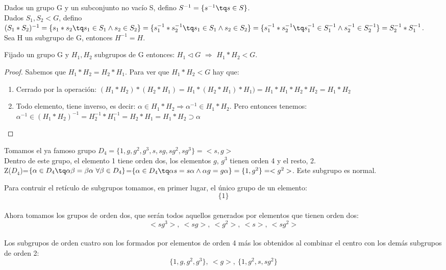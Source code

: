 \documentclass[a4paper,10pt]{apuntes}
\begin{document}
 Dados un grupo G y un subconjunto no vacío S, defino $S^{-1}=\{s^{-1}\tq s\in S\}$.\\
 Dados $S_{1},S_{2}<G$, defino $(S_{1}*S_{2})^{-1}=\{s_{1}*s_{2}\tq s_{1}\in S_{1} \wedge s_{2}\in S_{2}\}=\{s_{1}^{-1}*s_{2}^{-1}\tq s_{1}\in S_{1} \wedge s_{2}\in S_{2}\}=
 \{s_{1}^{-1}*s_{2}^{-1}\tq s_{1}^{-1}\in S_{1}^{-1} \wedge s_{2}^{-1}\in S_{2}^{-1}\}=S_{2}^{-1}*S_{1}^{-1}$.\\
 Sea H un subgrupo de G, entonces $H^{-1}=H$.
 
 \begin{theorem}
  Fijado un grupo G y $H_{1}, H_{2}$  subgrupos de G entonces: $H_{1} \vartriangleleft G$ $\Rightarrow$ $H_{1}*H_{2}<G$. 
 \end{theorem}
 \begin{proof}
  Sabemos que $H_{1}*H_{2}=H_{2}*H_{1}$. Para ver que $H_{1}*H_{2}<G$  hay que:
  \begin{enumerate}
   \item Cerrado por la operación: $(H_{1}*H_{2})*(H_{2}*H_{1})=H_{1}*(H_{2}*H_{1})*H_{1})=H_{1}*H_{1}*H_{2}*H_{2}=H_{1}*H_{2}$
   \item Todo elemento, tiene inverso, es decir: $\alpha\in H_{1}*H_{2}\Rightarrow \alpha^{-1}\in H_{1}*H_{2}$. Pero entonces tenemos:
   $\alpha^{-1}\in (H_{1}*H_{2})^{-1} = H_{2}^{-1}*H_{1}^{-1}=H_{2}*H_{1}=H_{1}*H_{2}\supset\alpha$
  \end{enumerate}

 \end{proof}

 \begin{example}
  Tomamos el ya famoso grupo $D_{4}=\{1,g,g^{2},g^{3}, s, sg, sg^{2}, sg^{3}\}=<s,g>$\\
  Dentro de este grupo, el elemento 1 tiene orden dos, los elementos $g$, $g^{3}$  tienen orden 4 y el resto, 2.\\
  Z($D_{4}$)=$\{\alpha\in D_{4} \tq \alpha\beta=\beta\alpha \ \forall \beta \in D_{4}\}$=$\{\alpha\in D_{4}\tq \alpha s = s\alpha \wedge \alpha g = g\alpha\}=\{1, g^{2}\}=<g^{2}>$. Este subgrupo es normal.
  
  Para contruir el retículo de subgrupos tomamos, en primer lugar, el único grupo de un elemento: \\
  $$\{1\}$$\\
  Ahora tomamos los grupos de orden dos, que serán todos aquellos generados por elementos que tienen orden dos:\\
  $$<sg^{3}>, \ <sg>, \ <g^{2}>, \ <s>, \ <sg^{2}>$$\\
  Los subgrupos de orden cuatro son los formados por elementos de orden 4 más los obtenidos al combinar el centro con los demás subgrupos de orden 2:\\
  $$\{1,g,g^{2},g^{3}\}, \ <g>, \ \{1, g^{2}, s, sg^{2}\}$$
 \end{example}
 
\end{document}
